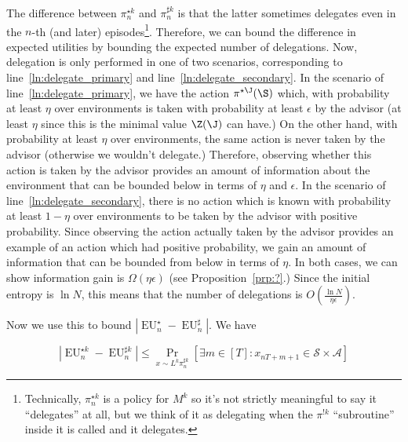 \documentclass[anon,12pt]{colt2018} %
\newcommand{\Comment}[1]{}
\newcommand{\AP}[1]{\left(#1\right)}
\newcommand{\AB}[1]{\left[#1\right]}
\newcommand{\Pa}[2]{\underset{#1}{\operatorname{Pr}}\AB{#2}}
\newcommand{\Abs}[1]{\left\vert #1 \right\vert}
\newcommand{\A}{\mathcal{A}}
\newcommand{\St}{\mathcal{S}}
\newcommand{\EU}{\operatorname{EU}}
\begin{document}
The difference between $\pi^{\star k}_n$ and $\pi^{\sharp k}_n$ is that the latter sometimes delegates even in the $n$-th (and later) episodes\footnote{Technically, $\pi^{\star k}_n$ is a policy for $M^k$ so it's not strictly meaningful to say it \enquote{delegates} at all, but we think of it as delegating when the $\pi^{!k}$ \enquote{subroutine} inside it is called and it delegates.}. Therefore, we can bound the difference in expected utilities by bounding the expected number of delegations. Now, delegation is only performed in one of two scenarios, corresponding to line~\ref{ln:delegate_primary} and line~\ref{ln:delegate_secondary}. In the scenario of line~\ref{ln:delegate_primary}, we have the action $\pi^{\star\J}(\S)$ which, with probability at least $\eta$ over environments is taken with probability at least $\epsilon$ by the advisor (at least $\eta$ since this is the minimal value $\Z(\J)$ can have.) On the other hand, with probability at least $\eta$ over environments, the same action is never taken by the advisor (otherwise we wouldn't delegate.) Therefore, observing whether this action is taken by the advisor provides an amount of information about the environment that can be bounded below in terms of $\eta$ and $\epsilon$. In the scenario of line~\ref{ln:delegate_secondary}, there is no action which is known with probability at least $1-\eta$ over environments to be taken by the advisor with positive probability. Since observing the action actually taken by the advisor provides an example of an action which had positive probability, we gain an amount of information that can be bounded from below in terms of $\eta$. In both cases, we can show information gain is $\Omega(\eta\epsilon)$ (see Proposition~\ref{prp:?}.) Since the initial entropy is $\ln{N}$, this means that the number of delegations is $O\AP{\frac{\ln{N}}{\eta\epsilon}}$.

\Comment{This establishes inequality~(\ref{eqn:thm__regret_bound__delegations})\footnote{The reason inequality~(\ref{eqn:thm__regret_bound__delegations}) has $\frac{1}{\eta}+N$ instead of $\eta$ and $\frac{1}{\epsilon}+\Abs{\A}$ instead of $\epsilon$ is because we needed to assume w.l.o.g. that $\eta < \frac{1}{N}$ and $\epsilon < \frac{1}{\Abs{A}}$.}}

Now we use this to bound $\Abs{\EU^\star_n-\EU^\sharp_n}$. We have

\begin{equation}
\Abs{\EU^{\star k}_n-\EU^{\sharp k}_n} \leq \Pa{x\sim L^k\pi^{\sharp k}_n}{\exists m \in [T]: x_{nT+m+1}\in\St \times \A}
\end{equation}
\end{document}
